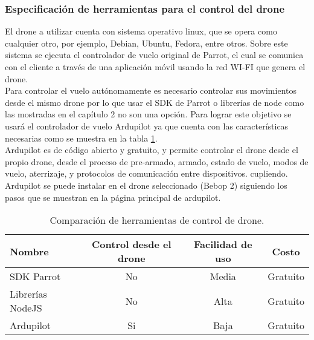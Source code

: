 
\subsubsection{Especificación de herramientas para el control del drone}

El drone a utilizar cuenta con sistema operativo linux, que se opera como 
cualquier otro, por ejemplo, Debian, Ubuntu, Fedora, entre otros. Sobre este 
sistema se ejecuta el controlador de vuelo original de Parrot, el cual se 
comunica con el cliente a través de una aplicación móvil usando la red WI-FI que 
genera el drone. \\

Para controlar el vuelo autónomamente es necesario controlar sus movimientos 
desde el mismo drone por lo que usar el SDK de Parrot o librerías de node como 
las mostradas en el capítulo 2 no son una opción. Para lograr este objetivo se 
usará el controlador de vuelo Ardupilot ya que cuenta con las características 
necesarias como se muestra en la tabla \ref{tabla:herramientas-control-drone}.\\

Ardupilot es de código abierto y gratuito, y permite controlar el drone desde el 
propio drone, desde el proceso de pre-armado, armado, estado de vuelo, modos de 
vuelo, aterrizaje, y protocolos de comunicación entre dispositivos. cupliendo.\\

Ardupilot se puede instalar en el drone seleccionado (Bebop 2) siguiendo los 
pasos que se muestran en la página principal de ardupilot.

\begin{table}[H]
	\centering
	\caption{Comparación de herramientas de control de drone.}
	\label{tabla:herramientas-control-drone}
	\begin{tabular}{|l|c|c|c|}
		\hline
		\centering\textbf{Nombre} &
		\textbf{Control desde el drone} &
		\textbf{Facilidad de uso} &
		\textbf{Costo}
		\\ \hline
		SDK Parrot &
		No &
		Media &
		Gratuito
		\\ \hline
		Librerías NodeJS &
		No &
		Alta &
		Gratuito
		\\ \hline
		\rowcolor{colorGrisClaro}
		Ardupilot &
		Si &
		Baja &
		Gratuito
		\\ \hline
	\end{tabular}
\end{table}
